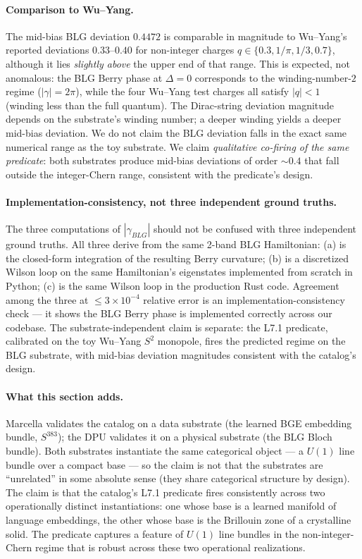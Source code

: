 \documentclass[11pt,letterpaper]{article}
\begin{document}
\paragraph{Comparison to Wu--Yang.}
The mid-bias BLG deviation $0.4472$ is comparable in magnitude to
Wu--Yang's reported deviations $0.33$--$0.40$ for non-integer
charges $q \in \{0.3, 1/\pi, 1/3, 0.7\}$, although it lies
\emph{slightly above} the upper end of that range. This is expected,
not anomalous: the BLG Berry phase at $\Delta = 0$ corresponds to
the winding-number-$2$ regime ($|\gamma| = 2\pi$), while the four
Wu--Yang test charges all satisfy $|q| < 1$ (winding less than the
full quantum). The Dirac-string deviation magnitude depends on the
substrate's winding number; a deeper winding yields a deeper
mid-bias deviation. We do not claim the BLG deviation falls in the
exact same numerical range as the toy substrate. We claim
\emph{qualitative co-firing of the same predicate}: both
substrates produce mid-bias deviations of order $\sim 0.4$ that
fall outside the integer-Chern range, consistent with the
predicate's design.

\paragraph{Implementation-consistency, not three independent ground truths.}
The three computations of $|\gamma_{BLG}|$ should not be confused
with three independent ground truths. All three derive from the
same 2-band BLG Hamiltonian: (a) is the closed-form integration of
the resulting Berry curvature; (b) is a discretized Wilson loop on
the same Hamiltonian's eigenstates implemented from scratch in
Python; (c) is the same Wilson loop in the production Rust code.
Agreement among the three at $\leq 3 \times 10^{-4}$ relative error
is an implementation-consistency check --- it shows the BLG Berry
phase is implemented correctly across our codebase. The
substrate-independent claim is separate: the L7.1 predicate,
calibrated on the toy Wu--Yang $S^2$ monopole, fires the
predicted regime on the BLG substrate, with mid-bias deviation
magnitudes consistent with the catalog's design.

\paragraph{What this section adds.}
Marcella validates the catalog on a data substrate (the learned BGE
embedding bundle, $S^{383}$); the DPU validates it on a physical
substrate (the BLG Bloch bundle). Both substrates instantiate the
same categorical object --- a $U(1)$ line bundle over a compact
base --- so the claim is not that the substrates are
``unrelated'' in some absolute sense (they share categorical
structure by design). The claim is that the catalog's L7.1
predicate fires consistently across two operationally distinct
instantiations: one whose base is a learned manifold of language
embeddings, the other whose base is the Brillouin zone of a
crystalline solid. The predicate captures a feature of $U(1)$ line
bundles in the non-integer-Chern regime that is robust across
these two operational realizations.
\end{document}

